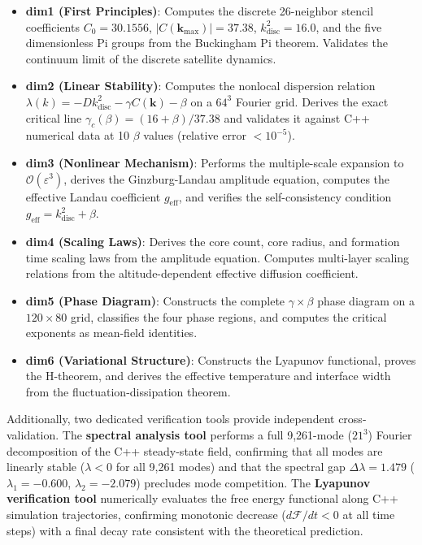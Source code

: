 \documentclass[sn-nature,pdflatex]{sn-jnl}
\begin{document}
\begin{itemize}
  \item \textbf{dim1 (First Principles)}: Computes the discrete 26-neighbor stencil coefficients $C_0 = 30.1556$, $|C(\mathbf{k}_{\max})| = 37.38$, $k^2_{\text{disc}} = 16.0$, and the five dimensionless Pi groups from the Buckingham Pi theorem. Validates the continuum limit of the discrete satellite dynamics.
  \item \textbf{dim2 (Linear Stability)}: Computes the nonlocal dispersion relation $\lambda(k) = -D k^2_{\text{disc}} - \gamma C(\mathbf{k}) - \beta$ on a $64^3$ Fourier grid. Derives the exact critical line $\gamma_c(\beta) = (16+\beta)/37.38$ and validates it against C++ numerical data at 10 $\beta$ values (relative error $<10^{-5}$).
  \item \textbf{dim3 (Nonlinear Mechanism)}: Performs the multiple-scale expansion to $\mathcal{O}(\varepsilon^3)$, derives the Ginzburg-Landau amplitude equation, computes the effective Landau coefficient $g_{\text{eff}}$, and verifies the self-consistency condition $g_{\text{eff}} = k^2_{\text{disc}} + \beta$.
  \item \textbf{dim4 (Scaling Laws)}: Derives the core count, core radius, and formation time scaling laws from the amplitude equation. Computes multi-layer scaling relations from the altitude-dependent effective diffusion coefficient.
  \item \textbf{dim5 (Phase Diagram)}: Constructs the complete $\gamma \times \beta$ phase diagram on a $120 \times 80$ grid, classifies the four phase regions, and computes the critical exponents as mean-field identities.
  \item \textbf{dim6 (Variational Structure)}: Constructs the Lyapunov functional, proves the H-theorem, and derives the effective temperature and interface width from the fluctuation-dissipation theorem.
\end{itemize}

Additionally, two dedicated verification tools provide independent cross-validation. The \textbf{spectral analysis tool} performs a full 9,261-mode ($21^3$) Fourier decomposition of the C++ steady-state field, confirming that all modes are linearly stable ($\lambda < 0$ for all 9,261 modes) and that the spectral gap $\Delta\lambda = 1.479$ ($\lambda_1 = -0.600$, $\lambda_2 = -2.079$) precludes mode competition. The \textbf{Lyapunov verification tool} numerically evaluates the free energy functional along C++ simulation trajectories, confirming monotonic decrease ($d\mathcal{F}/dt < 0$ at all time steps) with a final decay rate consistent with the theoretical prediction.
\end{document}
